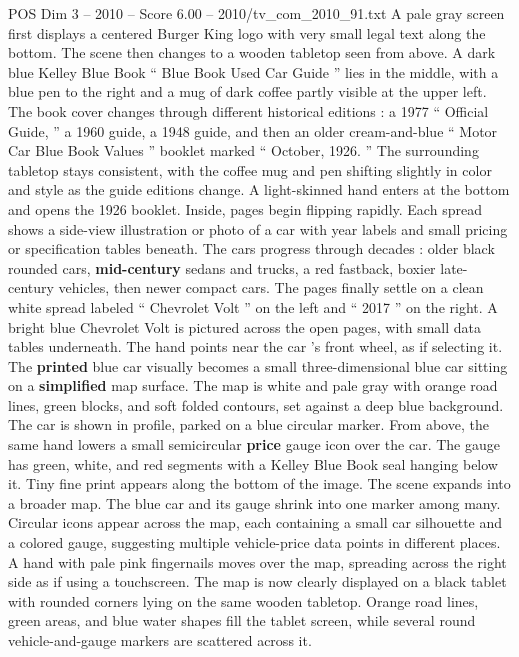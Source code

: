 \begin{textsample}{POS Dim 3 – 2010 – Score 6.00 – 2010/tv\_com\_2010\_91.txt}  \label{ex:f3_pos_082}
A pale gray screen first displays a centered Burger King logo with very small legal text along the bottom.
The scene then changes to a wooden tabletop seen from above.
A dark blue Kelley Blue Book “ Blue Book Used Car Guide ” lies in the middle, with a blue pen to the right and a mug of dark coffee partly visible at the upper left.
The book cover changes through different historical editions : a 1977 “ Official Guide, ” a 1960 guide, a 1948 guide, and then an older cream-and-blue “ Motor Car Blue Book Values ” booklet marked “ October, 1926. ” The surrounding tabletop stays consistent, with the coffee mug and pen shifting slightly in color and style as the guide editions change.
A light-skinned hand enters at the bottom and opens the 1926 booklet.
Inside, pages begin flipping rapidly.
Each spread shows a side-view illustration or photo of a car with year labels and small pricing or specification tables beneath.
The cars progress through decades : older black rounded cars, \textbf{mid-century} sedans and trucks, a red fastback, boxier late-century vehicles, then newer compact cars.
The pages finally settle on a clean white spread labeled “ Chevrolet Volt ” on the left and “ 2017 ” on the right.
A bright blue Chevrolet Volt is pictured across the open pages, with small data tables underneath.
The hand points near the car ’s front wheel, as if selecting it.
The \textbf{printed} blue car visually becomes a small three-dimensional blue car sitting on a \textbf{simplified} map surface.
The map is white and pale gray with orange road lines, green blocks, and soft folded contours, set against a deep blue background.
The car is shown in profile, parked on a blue circular marker.
From above, the same hand lowers a small semicircular \textbf{price} gauge icon over the car.
The gauge has green, white, and red segments with a Kelley Blue Book seal hanging below it.
Tiny fine print appears along the bottom of the image.
The scene expands into a broader map.
The blue car and its gauge shrink into one marker among many.
Circular icons appear across the map, each containing a small car silhouette and a colored gauge, suggesting multiple vehicle-price data points in different places.
A hand with pale pink fingernails moves over the map, spreading across the right side as if using a touchscreen.
The map is now clearly displayed on a black tablet with rounded corners lying on the same wooden tabletop.
Orange road lines, green areas, and blue water shapes fill the tablet screen, while several round vehicle-and-gauge markers are scattered across it.

\end{textsample}
